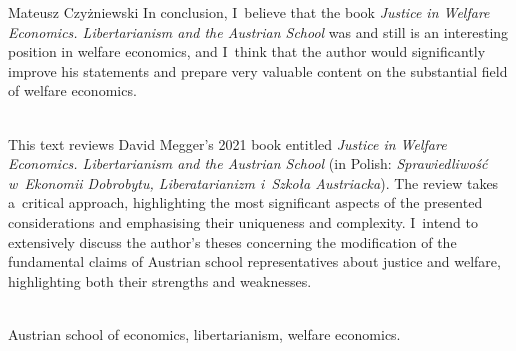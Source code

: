 \begin{newrevengenv}{Mateusz Czyżniewski}
In conclusion, I~believe that the book \textit{Justice in Welfare Economics. Libertarianism and the Austrian School} was and still is an interesting position in welfare economics, and I~think that the author would significantly improve his statements and prepare very valuable content on the substantial field of welfare economics.



\vspace{15mm}%
{}\\
{This text reviews David Megger's 2021 book entitled \textit{Justice in Welfare Economics. Libertarianism and the Austrian School} (in Polish: \textit{Sprawiedliwość w~Ekonomii Dobrobytu, Liberatarianizm i~Szkoła Austriacka}). The review takes a~critical approach, highlighting the most significant aspects of the presented considerations and emphasising their uniqueness and complexity. I~intend to extensively discuss the author's theses concerning the modification of the fundamental claims of Austrian school representatives about justice and welfare, highlighting both their strengths and weaknesses.}\par%
\vspace{2mm}%
{}\\
{Austrian school of economics, libertarianism, welfare economics.
}%



\end{newrevengenv}


